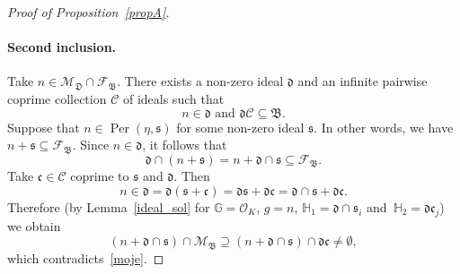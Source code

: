 \documentclass[leqno,a4paper,12pt]{article}
\theoremstyle{definition}
\newcommand{\Per}{\operatorname{Per}\nolimits}
\newcommand{\OK}{\mathcal{O}_K}
\newcommand{\G}{\mathbb{G}}
\newcommand{\HH}{{\mathbb{H}}}
\begin{document}
\begin{proof}[Proof of Proposition~\ref{propA}]
\paragraph{Second inclusion.} Take $n\in\mathcal{M}_\mathfrak{D}\cap\mathcal{F}_\mathfrak{B}$.  There exists a non-zero ideal $\mathfrak{d}$ and an infinite pairwise coprime collection $\mathcal{C}$ of ideals such that
\[
n\in\mathfrak{d} \text{ and }\mathfrak{d}\mathcal{C}\subseteq \mathfrak{B}.
\]
Suppose that $n\in\Per(\eta,\mathfrak{s})$ for some non-zero ideal $\mathfrak{s}$. In other words, we have $n+\mathfrak{s}\subseteq \mathcal{F}_\mathfrak{B}$. Since $n\in\mathfrak{d}$, it follows that
\begin{equation}\label{moje}
\mathfrak{d}\cap (n+\mathfrak{s})=n+\mathfrak{d}\cap\mathfrak{s}\subseteq \mathcal{F}_\mathfrak{B}.
\end{equation}
Take $\mathfrak{c}\in\mathcal{C}$ coprime to $\mathfrak{s}$ and $\mathfrak{d}$. Then
\[
n\in\mathfrak{d}=\mathfrak{d}(\mathfrak{s}+\mathfrak{c})=\mathfrak{d}\mathfrak{s}+\mathfrak{d}\mathfrak{c}=\mathfrak{d}\cap\mathfrak{s}+\mathfrak{d}\mathfrak{c}.
\]
Therefore (by Lemma~\ref{ideal_sol} for $\G=\OK$, $g=n$, $\HH_1=\mathfrak{d}\cap\mathfrak{s}_i$ and~$\HH_2=\mathfrak{d}\mathfrak{c}_j$) we obtain
\[
(n+\mathfrak{d}\cap\mathfrak{s})\cap \mathcal{M}_\mathfrak{B}\supseteq(n+\mathfrak{d}\cap\mathfrak{s})\cap \mathfrak{d}\mathfrak{c}\neq\emptyset,
\]
which contradicts~\eqref{moje}.

\end{proof}
\end{document}
